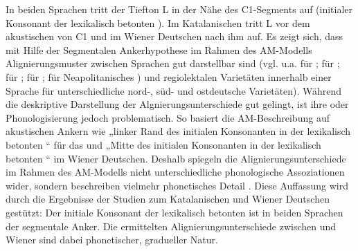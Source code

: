 In beiden Sprachen tritt der Tiefton L in der Nähe des C1-Segments auf (initialer Konsonant der lexikalisch betonten ). Im Katalanischen tritt L vor dem akustischen  von C1 und im Wiener Deutschen nach ihm auf. Es zeigt sich, dass mit Hilfe der Segmentalen Ankerhypothese im Rahmen des AM-Modells Alignierungsmuster zwischen Sprachen gut darstellbar sind (vgl. u.a. \citealt{Arvaniti1998} für ; 
\citealt{Prieto2007b} für ; 
\citealt{Ladd1999} für ; 
\citealt{Ladd2000} für ;
\citealt{Dimperio2007} für Neapolitanisches ) und regiolektalen Varietäten innerhalb einer Sprache \citep[u.a.][]{Atterer2004, Braun2007, Mücke2008a, Mücke2008b, Kleber2008, Mücke2009a, Mücke2009b} für unterschiedliche nord-, süd- und ostdeutsche Varietäten). Während die deskriptive Darstellung der Algnierungsunterschiede gut gelingt, ist ihre  oder Phonologisierung jedoch problematisch. So basiert die AM-Beschreibung auf akustischen Ankern wie „linker Rand des initialen Konsonanten in der lexikalisch betonten “ für das  und „Mitte des initialen Konsonanten in der lexikalisch betonten “ im Wiener Deutschen. Deshalb spiegeln die Alignierungsunterschiede im Rahmen des AM-Modells nicht unterschiedliche phonologische Assoziationen wider, sondern beschreiben vielmehr phonetisches Detail \citep{Atterer2004,Ladd2008}. Diese Auffassung wird durch die Ergebnisse der Studien zum Katalanischen und Wiener Deutschen gestützt: Der initiale Konsonant der lexikalisch betonten  ist in beiden Sprachen der segmentale Anker. Die ermittelten Alignierungsunterschiede zwischen  und Wiener  sind dabei phonetischer, gradueller Natur.

